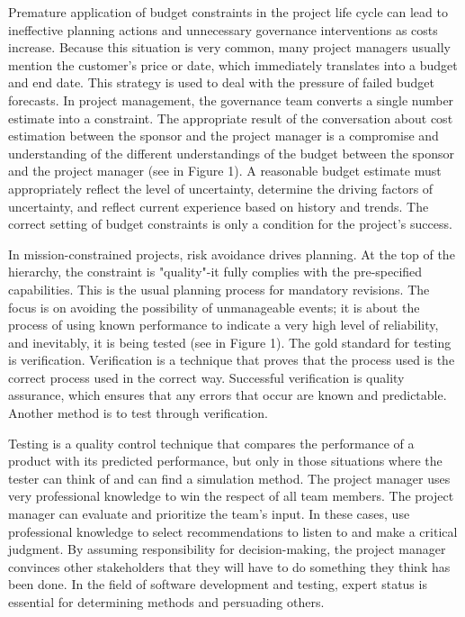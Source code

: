 \documentclass{sigchi}
\begin{document}
Premature application of budget constraints in the project life cycle can lead to ineffective planning actions and unnecessary governance interventions as costs increase. Because this situation is very common, many project managers usually mention the customer's price or date, which immediately translates into a budget and end date. This strategy is used to deal with the pressure of failed budget forecasts. In project management, the governance team converts a single number estimate into a constraint. The appropriate result of the conversation about cost estimation between the sponsor and the project manager is a compromise and understanding of the different understandings of the budget between the sponsor and the project manager (see in Figure 1). A reasonable budget estimate must appropriately reflect the level of uncertainty, determine the driving factors of uncertainty, and reflect current experience based on history and trends. The correct setting of budget constraints is only a condition for the project's success.

In mission-constrained projects, risk avoidance drives planning. At the top of the hierarchy, the constraint is "quality"-it fully complies with the pre-specified capabilities. This is the usual planning process for mandatory revisions. The focus is on avoiding the possibility of unmanageable events; it is about the process of using known performance to indicate a very high level of reliability, and inevitably, it is being tested (see in Figure 1). The gold standard for testing is verification. Verification is a technique that proves that the process used is the correct process used in the correct way. Successful verification is quality assurance, which ensures that any errors that occur are known and predictable. Another method is to test through verification. 

Testing is a quality control technique that compares the performance of a product with its predicted performance, but only in those situations where the tester can think of and can find a simulation method. The project manager uses very professional knowledge to win the respect of all team members. The project manager can evaluate and prioritize the team's input. In these cases, use professional knowledge to select recommendations to listen to and make a critical judgment. By assuming responsibility for decision-making, the project manager convinces other stakeholders that they will have to do something they think has been done. In the field of software development and testing, expert status is essential for determining methods and persuading others. 
\end{document}
